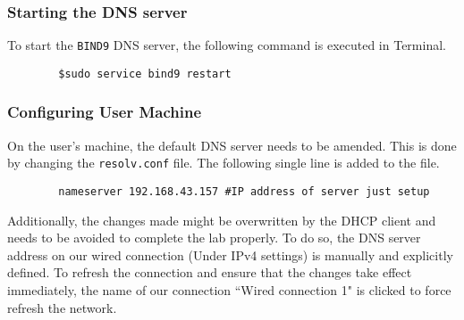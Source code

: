 \documentclass[a4paper,12pt]{article}
\begin{document}
		\subsubsection{Starting the DNS server}
		To start the \texttt{BIND9} DNS server, the following command is executed in Terminal.		\begin{verbatim}
		$sudo service bind9 restart
		\end{verbatim}
		\subsubsection{Configuring User Machine}
		\begin{par}
		On the user's machine, the default DNS server needs to be amended. This is done by changing the \texttt{resolv.conf} file. The following single line is added to the file.\end{par} 
		\begin{verbatim}
		nameserver 192.168.43.157 #IP address of server just setup
		\end{verbatim}
		\begin{par}
		\noindent Additionally, the changes made might be overwritten by the DHCP client and needs to be avoided to complete the lab properly. To do so, the DNS server address on our wired connection (Under IPv4 settings) is manually and explicitly defined. To refresh the connection and ensure that the changes take effect immediately, the name of our connection ``Wired connection 1" is clicked to force refresh the network.
		\end{par}
\end{document}
